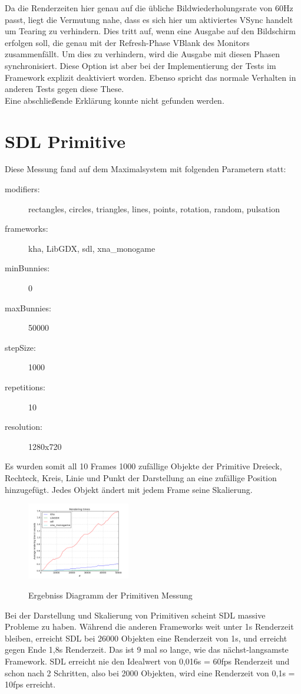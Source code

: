 Da die Renderzeiten hier genau auf die übliche Bildwiederholungsrate von 60Hz passt, liegt die Vermutung nahe, dass es sich hier um aktiviertes VSync handelt um Tearing zu verhindern. Dies tritt auf, wenn eine Ausgabe auf den Bildschirm erfolgen soll, die genau mit der Refresh-Phase VBlank des Monitors zusammenfällt. Um dies zu verhindern, wird die Ausgabe mit diesen Phasen synchronisiert. Diese Option ist aber bei der Implementierung der Tests im Framework explizit deaktiviert worden. Ebenso spricht das normale Verhalten in anderen Tests gegen diese These. \\
Eine abschließende Erklärung konnte nicht gefunden werden. 

\section{SDL Primitive}
Diese Messung fand auf dem Maximalsystem mit folgenden Parametern statt:
\begin{description}
\item[modifiers:] rectangles, circles, triangles, lines, points, rotation, random, pulsation
\item[frameworks:] kha, LibGDX, sdl, xna_monogame
\item[minBunnies:] 0
\item[maxBunnies:] 50000
\item[stepSize:] 1000
\item[repetitions:] 10
\item[resolution:] 1280x720
\end{description}
Es wurden somit all 10 Frames 1000 zufällige Objekte der Primitive Dreieck, Rechteck, Kreis, Linie und Punkt der Darstellung an eine zufällige Position hinzugefügt. Jedes Objekt ändert mit jedem Frame seine Skalierung.
\begin{figure}[h]
\caption{Ergebniss Diagramm der Primitiven Messung}
\centering
\includegraphics[width=0.4\textwidth]{sdl_primitives}
\label{dia:sdl_primitives}
\end{figure}
Bei der Darstellung und Skalierung von Primitiven scheint SDL massive Probleme zu haben. Während die anderen Frameworks weit unter 1s Renderzeit bleiben, erreicht SDL bei 26000 Objekten eine Renderzeit von 1s, und erreicht gegen Ende 1,8s Renderzeit. Das ist 9 mal so lange, wie das nächst-langsamste Framework. SDL erreicht nie den Idealwert von 0,016s = 60fps Renderzeit und schon nach 2 Schritten, also bei 2000 Objekten, wird eine Renderzeit von 0,1s = 10fps erreicht.\\
